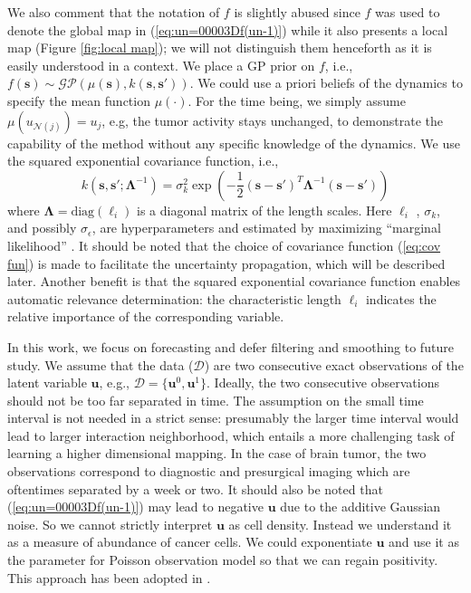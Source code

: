 \documentclass[11pt, reqno]{amsart}
\begin{document}
We also comment that the notation of $f$ is slightly abused since $f$ was used to denote the global map in (\ref{eq:un=00003Df(un-1)}) while it also presents a local map (Figure \ref{fig:local map}); we will not distinguish them henceforth as it is easily understood in a context. We place a GP prior on $f$, i.e., $f(\mathbf{s})\sim\mathcal{GP}(\mu(\mathbf{s}),k(\mathbf{s},\mathbf{s}'))$. We could use a priori beliefs of the dynamics to specify the mean function $\mu(\cdot)$. For the time being, we simply assume $\mu(u_{\mathcal{N}(j)})=u_{j}$, e.g, the tumor activity stays unchanged, to demonstrate the capability of the method without any specific knowledge of the dynamics. We use the squared exponential covariance function, i.e., 
\begin{equation}
k(\mathbf{s},\mathbf{s}';\boldsymbol{\Lambda}^{-1})=\sigma_{k}^{2}\exp(-\frac{1}{2}(\mathbf{s-s}')^{T}\boldsymbol{\Lambda}^{-1}(\mathbf{s-s}')) \label{eq:cov fun}
\end{equation}
 where $\boldsymbol{\Lambda}=\text{diag}(\ell_{i})$ is a diagonal matrix of the length scales. Here $\ell_{i}$ , $\sigma_{k}$, and possibly $\sigma_{\epsilon}$, are hyperparameters and estimated by maximizing ``marginal likelihood'' \citep{Rasmussen2006}. It should be noted that the choice of covariance function (\ref{eq:cov fun}) is made to facilitate the uncertainty propagation, which will be described later. Another benefit is that the squared exponential covariance function enables automatic relevance determination: the characteristic length $\ell_{i}$ indicates the relative importance of the corresponding variable. 

In this work, we focus on forecasting and defer filtering and smoothing to future study. We assume that the data ($\mathcal{D}$) are two consecutive exact observations of the latent variable $\mathbf{u}$, e.g., $\mathcal{D}=\{\mathbf{u}^{0},\mathbf{u}^{1}\}$.  Ideally, the two consecutive observations should not be too far separated in time.  The assumption on the small time interval is not needed in a strict sense: presumably the larger time interval would lead to larger interaction neighborhood, which entails a more challenging task of learning a higher dimensional mapping. In the case of brain tumor, the two observations  correspond to diagnostic and presurgical imaging which are oftentimes separated by a week or two.  It should also be noted that (\ref{eq:un=00003Df(un-1)}) may lead to negative $\mathbf{u}$ due to the additive Gaussian noise. So we cannot strictly interpret $\mathbf{u}$ as cell density. Instead we understand it as a measure of abundance of cancer cells. We could exponentiate $\mathbf{u}$ and use it as the parameter for Poisson observation model so that we can regain positivity. This approach has been adopted in \citep{Hooten2008}.
\end{document}
